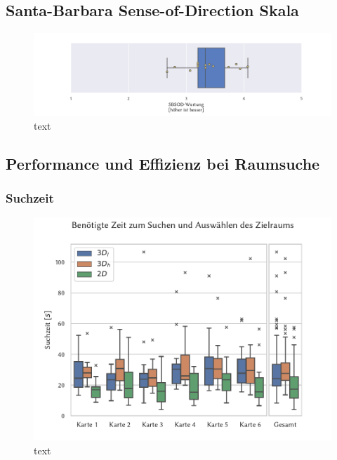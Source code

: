 \subsection{Santa-Barbara Sense-of-Direction Skala}

\begin{figure}
    \centering
    \includegraphics[width=\linewidth]{figures/analysis/sbsod}
    \caption{text}
    \label{fig:sbsod}
\end{figure}

\subsection{Performance und Effizienz bei Raumsuche}


\subsubsection*{Suchzeit}

\begin{figure}
    \centering
    \includegraphics[width=\linewidth]{figures/analysis/megamap_time}
    \caption{text}
    \label{fig:boxplot_times}
\end{figure}

